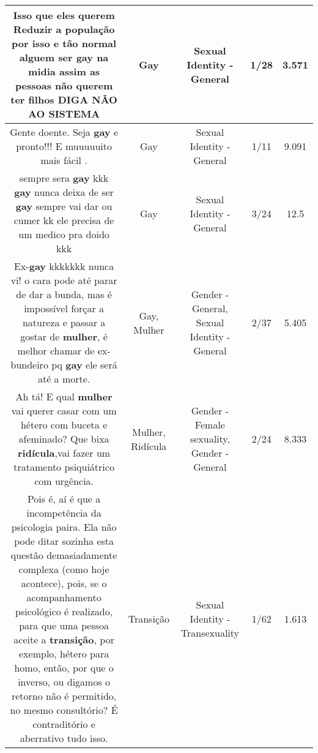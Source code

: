 \documentclass[11pt]{article}
\newlength\mylength
\begin{document}
\begin{center}
\begin{longtable}{|C{.65\mylength}|C{.30\mylength}|C{.12\mylength}|C{.12\mylength}|C{.12\mylength}|}
  \small Isso que eles querem Reduzir a população por isso e tão normal alguem ser \textbf{gay} na midia assim as pessoas não querem ter filhos DIGA NÃO AO SISTEMA\normalsize   & Gay & Sexual Identity - General & 1/28 & 3.571 \\  \hline
  \small Gente doente. Seja \textbf{gay} e pronto!!! E muuuuuito mais fácil .\normalsize   & Gay & Sexual Identity - General & 1/11 & 9.091 \\  \hline
  \small sempre sera \textbf{gay} kkk \textbf{gay} nunca deixa de ser \textbf{gay} sempre vai dar ou cumer kk  ele precisa de um medico pra doido kkk\normalsize   & Gay & Sexual Identity - General & 3/24 & 12.5 \\  \hline
  \small Ex-\textbf{gay} kkkkkkk nunca vi! o cara pode até parar de dar a bunda, mas é impossível forçar a natureza e passar a gostar de \textbf{mulher}, é melhor chamar de ex-bundeiro pq \textbf{gay} ele será até a morte.\normalsize   & Gay, Mulher & Gender - General, Sexual Identity - General & 2/37 & 5.405 \\  \hline
  \small Ah tá! E qual \textbf{mulher} vai querer casar com um hétero com buceta e afeminado? Que bixa \textbf{ridícula},vai fazer um tratamento psiquiátrico com urgência.\normalsize   & Mulher, Ridícula & Gender - Female sexuality, Gender - General & 2/24 & 8.333 \\  \hline
  \small Pois é, aí é que a incompetência da psicologia paira. Ela não pode ditar sozinha esta questão demasiadamente complexa (como hoje acontece), pois, se o acompanhamento psicológico é realizado, para que uma pessoa aceite a \textbf{transição}, por exemplo, hétero para homo, então, por que o inverso, ou digamos o retorno não é permitido, no mesmo consultório? É contraditório e aberrativo tudo isso.\normalsize   & Transição & Sexual Identity - Transexuality & 1/62 & 1.613 \\  \hline

\end{longtable}
\end{center}
\end{document}
